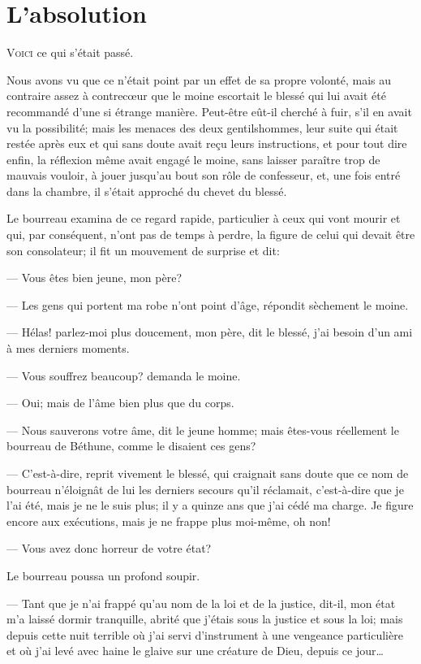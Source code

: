 \chapter{L'absolution}

\lettrine{V}{oici} ce qui s'était passé.

\zz
Nous avons vu que ce n'était point par un effet de sa propre volonté, mais au contraire assez à contrecœur que le moine escortait le blessé qui lui avait été recommandé d'une si étrange manière. Peut-être eût-il cherché à fuir, s'il en avait vu la possibilité; mais les menaces des deux gentilshommes, leur suite qui était restée après eux et qui sans doute avait reçu leurs instructions, et pour tout dire enfin, la réflexion même avait engagé le moine, sans laisser paraître trop de mauvais vouloir, à jouer jusqu'au bout son rôle de confesseur, et, une fois entré dans la chambre, il s'était approché du chevet du blessé.

Le bourreau examina de ce regard rapide, particulier à ceux qui vont mourir et qui, par conséquent, n'ont pas de temps à perdre, la figure de celui qui devait être son consolateur; il fit un mouvement de surprise et dit:

— Vous êtes bien jeune, mon père?

— Les gens qui portent ma robe n'ont point d'âge, répondit sèchement le moine.

— Hélas! parlez-moi plus doucement, mon père, dit le blessé, j'ai besoin d'un ami à mes derniers moments.

— Vous souffrez beaucoup? demanda le moine.

— Oui; mais de l'âme bien plus que du corps.

— Nous sauverons votre âme, dit le jeune homme; mais êtes-vous réellement le bourreau de Béthune, comme le disaient ces gens?

— C'est-à-dire, reprit vivement le blessé, qui craignait sans doute que ce nom de bourreau n'éloignât de lui les derniers secours qu'il réclamait, c'est-à-dire que je l'ai été, mais je ne le suis plus; il y a quinze ans que j'ai cédé ma charge. Je figure encore aux exécutions, mais je ne frappe plus moi-même, oh non!

— Vous avez donc horreur de votre état?

Le bourreau poussa un profond soupir.

— Tant que je n'ai frappé qu'au nom de la loi et de la justice, dit-il, mon état m'a laissé dormir tranquille, abrité que j'étais sous la justice et sous la loi; mais depuis cette nuit terrible où j'ai servi d'instrument à une vengeance particulière et où j'ai levé avec haine le glaive sur une créature de Dieu, depuis ce jour\dots

